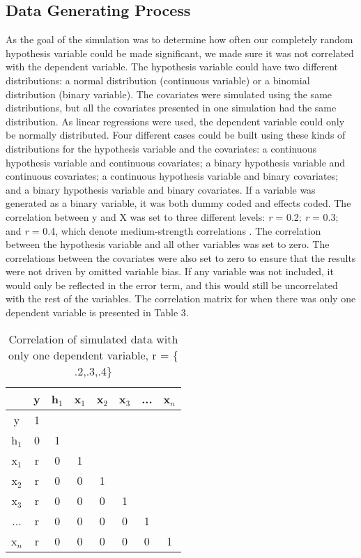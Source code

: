 \subsection{Data Generating Process}
As the goal of the simulation was to determine how often our completely random hypothesis variable could be made significant, we made sure it was not correlated with the dependent variable. The hypothesis variable could have two different distributions: a normal distribution (continuous variable) or a binomial distribution (binary variable). The covariates were simulated using the same distributions, but all the covariates presented in one simulation had the same distribution. As linear regressions were used, the dependent variable could only be normally distributed. Four different cases could be built using these kinds of distributions for the hypothesis variable and the covariates: a continuous hypothesis variable and continuous covariates; a binary hypothesis variable and continuous covariates; a continuous hypothesis variable and binary covariates; and a binary hypothesis variable and binary covariates. If a variable was generated as a binary variable, it was both dummy coded and effects coded.
The correlation between y and X was set to three different levels: \textit{r} = 0.2; \textit{r} = 0.3; and \textit{r} = 0.4, which denote medium-strength correlations \citep{Cohen1989}. The correlation between the hypothesis variable and all other variables was set to zero. The correlations between the covariates were also set to zero to ensure that the results were not driven by omitted variable bias. If any variable was not included, it would only be reflected in the error term, and this would still be uncorrelated with the rest of the variables. The correlation matrix for when there was only one dependent variable is presented in Table 3. \\

\begin{table}
\caption{}
\centering
\caption*{\footnotesize Correlation of simulated data with only one dependent variable, r = $\{$.2,.3,.4$\}$}
\begin{tabular}{c|ccccccc} 
\toprule
 & y & h${}_{1}$ & x${}_{1}$ & x${}_{2}$ & x${}_{3}$ & ... & x${}_{n}$ \\ 
 \midrule
y & 1 &  &  &  &  &  &  \\ 
h${}_{1}$ & 0 & 1 &  &  &  &  &  \\ 
x${}_{1}$ & r & 0 & 1 &  &  &  &  \\  
x${}_{2}$ & r & 0 & 0 & 1 &  &  &  \\  
x${}_{3}$ & r & 0 & 0 & 0 & 1 &  &  \\  
... & r & 0 & 0 & 0 & 0 & 1 &  \\ 
x${}_{n}$ & r & 0 & 0 & 0 & 0 & 0 & 1 \\ 
\bottomrule
\end{tabular}
\end{table}


